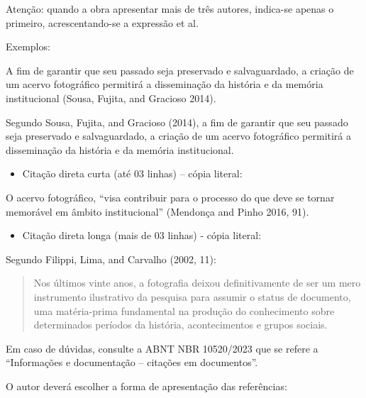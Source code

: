 \documentclass[
]{article}
\providecommand{\tightlist}{%
  \setlength{\itemsep}{0pt}\setlength{\parskip}{0pt}}
\begin{document}
Atenção: quando a obra apresentar mais de três autores, indica-se apenas
o primeiro, acrescentando-se a expressão et al.

Exemplos:

A fim de garantir que seu passado seja preservado e salvaguardado, a
criação de um acervo fotográfico permitirá a disseminação da história e
da memória institucional (Sousa, Fujita, and Gracioso 2014).

Segundo Sousa, Fujita, and Gracioso (2014), a fim de garantir que seu
passado seja preservado e salvaguardado, a criação de um acervo
fotográfico permitirá a disseminação da história e da memória
institucional.

\begin{itemize}
\tightlist
\item
  Citação direta curta (até 03 linhas) -- cópia literal:
\end{itemize}

O acervo fotográfico, ``visa contribuir para o processo do que deve se
tornar memorável em âmbito institucional'' (Mendonça and Pinho 2016,
91).

\begin{itemize}
\tightlist
\item
  Citação direta longa (mais de 03 linhas) - cópia literal:
\end{itemize}

Segundo Filippi, Lima, and Carvalho (2002, 11):

\begin{quote}
Nos últimos vinte anos, a fotografia deixou definitivamente de ser um
mero instrumento ilustrativo da pesquisa para assumir o status de
documento, uma matéria-prima fundamental na produção do conhecimento
sobre determinados períodos da história, acontecimentos e grupos
sociais.
\end{quote}

Em caso de dúvidas, consulte a ABNT NBR 10520/2023 que se refere a
``Informações e documentação -- citações em documentos''.

O autor deverá escolher a forma de apresentação das referências:
\end{document}
